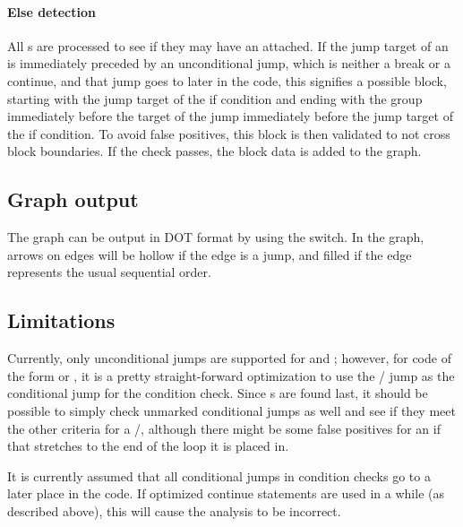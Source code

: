 \paragraph{Else detection}
All s are processed to see if they may have an  attached. If the jump target of an  is immediately preceded by an unconditional jump, which is neither a break or a continue, and that jump goes to later in the code, this signifies a possible  block, starting with the jump target of the if condition and ending with the group immediately before the target of the jump immediately before the jump target of the if condition. To avoid false positives, this block is then validated to not cross block boundaries. If the check passes, the  block data is added to the graph.

\subsection{Graph output}
The graph can be output in DOT format by using the  switch. In the graph, arrows on edges will be hollow if the edge is a jump, and filled if the edge represents the usual sequential order.

\subsection{Limitations}
Currently, only unconditional jumps are supported for  and ; however, for code of the form  or , it is a pretty straight-forward optimization to use the / jump as the conditional jump for the  condition check. Since s are found last, it should be possible to simply check unmarked conditional jumps as well and see if they meet the other criteria for a /, although there might be some false positives for an if that stretches to the end of the loop it is placed in.

It is currently assumed that all conditional jumps in  condition checks go to a later place in the code. If optimized continue statements are used in a while (as described above), this will cause the analysis to be incorrect.
